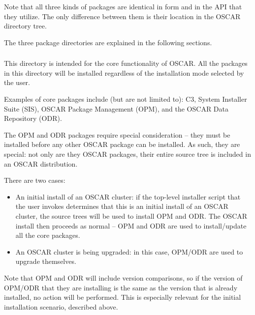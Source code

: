 Note that all three kinds of packages are identical in form and in the
API that they utilize.  The only difference between them is their
location in the OSCAR directory tree.

The three package directories are explained in the following sections.

\subsubsection{}

This directory is intended for the core functionality of OSCAR.  All
the packages in this directory will be installed regardless of the
installation mode selected by the user.

Examples of core packages include (but are not limited to): C3, System
Installer Suite (SIS), OSCAR Package Management (OPM), and the OSCAR
Data Repository (ODR).

The OPM and ODR packages require special consideration -- they must be
installed before any other OSCAR package can be installed.  As such,
they are special: not only are they OSCAR packages, their entire
source tree is included in an OSCAR distribution.  

There are two cases:

\begin{itemize}
\item An initial install of an OSCAR cluster: if the top-level
  installer script that the user invokes determines that this is an
  initial install of an OSCAR cluster, the source trees will be used
  to install OPM and ODR.  The OSCAR install then proceeds as normal
  -- OPM and ODR are used to install/update all the core packages.

\item An OSCAR cluster is being upgraded: in this case, OPM/ODR are
  used to upgrade themselves.
\end{itemize}

Note that OPM and ODR will include version comparisons, so if the
version of OPM/ODR that they are installing is the same as the version
that is already installed, no action will be performed.  This is
especially relevant for the initial installation scenario, described
above.

\subsubsection{}

